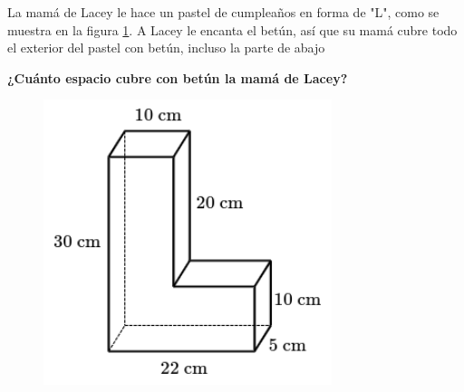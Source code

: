 La mamá de Lacey le hace un pastel de cumpleaños en forma de "L", como se muestra en la figura \ref{fig:vol_area_02}.
A Lacey le encanta el betún, así que su mamá cubre todo el exterior del pastel con betún, incluso la parte de abajo

\textbf{¿Cuánto espacio cubre con betún la mamá de Lacey?}\\

\begin{minipage}{0.3\linewidth}
    \begin{figure}[H]
        \begin{center}
            \includegraphics[width=0.75\textwidth]{../images/vol_area_02}
        \end{center}
        \caption{}
        \label{fig:vol_area_02}
    \end{figure}
\end{minipage}
\begin{minipage}{0.7\linewidth}
    \begin{solutionbox}{6cm}
    \end{solutionbox}
\end{minipage}